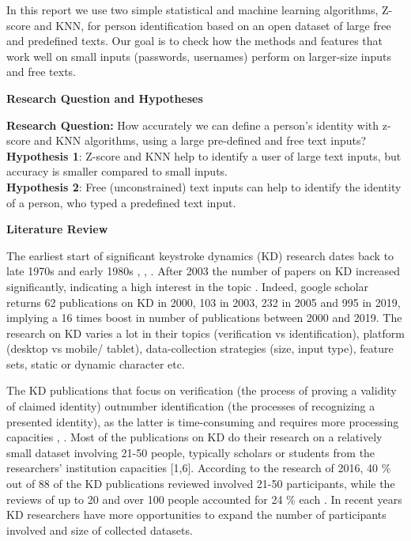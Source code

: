 \documentclass[12pt,a4]{article}
\begin{document}
In this report we use two simple statistical and machine learning algorithms, Z-score and KNN, for person identification based on an open dataset of large free and predefined texts. Our goal is to check how  the methods and features that work well on small inputs (passwords, usernames) perform on larger-size inputs and free texts.

\bigskip
\large\textbf{Research Question and Hypotheses}
\bigskip

\normalsize
\textbf{Research Question:} How accurately we can define a person's identity with z-score and KNN algorithms, using a large pre-defined and free text inputs? \\

\textbf{Hypothesis 1}: Z-score and KNN help to identify a user of large text inputs, but accuracy is smaller compared to small inputs. \\

\textbf{Hypothesis 2}: Free (unconstrained) text inputs can help to identify the identity of a person, who typed a predefined text input.

\bigskip

\large\textbf{Literature Review}
\bigskip

\normalsize
The earliest start of significant keystroke dynamics (KD) research dates back to late 1970s and early 1980s \cite{Teh:2013}, \cite{Liakat:2017}, \cite{killourhy2009comparing}. After 2003 the number of papers on KD increased significantly, indicating a high interest in the topic \cite{Teh:2013}. Indeed, google scholar returns 62 publications on KD in 2000, 103 in 2003, 232 in 2005 and 995 in 2019, implying a 16 times boost in number of publications between 2000 and 2019. The research on KD varies a lot in their topics (verification vs identification), platform (desktop vs mobile/ tablet), data-collection strategies (size, input type), feature sets, static or dynamic character etc.

The KD publications that focus on verification (the process of proving a validity of claimed identity) outnumber identification (the processes of recognizing a presented identity), as the latter is time-consuming and requires more processing capacities \cite{Teh:2013}, \cite{banerjee2014_emnlp}. Most of the publications on KD do their research on a relatively small dataset involving 21-50 people, typically scholars or students from the researchers’ institution capacities [1,6]. According to the research of 2016, 40 \% out of 88 of the KD publications reviewed involved 21-50 participants, while the reviews of up to 20 and over 100 people accounted for 24 \% each \cite{Liakat:2017}. In recent years KD researchers have more opportunities to expand the number of participants involved and size of collected datasets.
\end{document}
